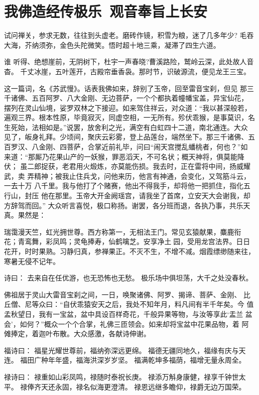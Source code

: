 \chapter{我佛造经传极乐~观音奉旨上长安}

试问禅关，参求无数，往往到头虚老。磨砖作镜，积雪为粮，迷了几多年少?
毛吞大海，芥纳须弥，金色头陀微笑。悟时超十地三乘，凝滞了四生六道。

谁
听得、绝想崖前，无阴树下，杜宇一声春晓?曹溪路险，鹫岭云深，此处故人音杳。
千丈冰崖，五叶莲开，古殿帘垂香袅。那时节，识破源流，便见龙王三宝。

这一篇词，名《苏武慢》。话表我佛如来，辞别了玉帝，回至雷音宝刹，但见
那三千诸佛、五百阿罗、八大金刚、无边菩萨，一个个都执着幢幡宝盖，异宝仙花，
摆列在灵山仙境，娑罗双林之下接迎。如来驾住祥云，对众道：“我以甚深般若，
遍观三界。根本性原，毕竟寂灭，同虚空相，一无所有。殄伏乖猴，是事莫识，名
生死始，法相如是。”说罢，放舍利之光，满空有白虹四十二道，南北通连。大众
见了，皈身礼拜。少顷间，聚庆云彩雾，登上品莲台，端然坐下。那三千诸佛、五
百罗汉、八金刚、四菩萨，合掌近前礼毕，问曰“闹天宫搅乱蟠桃者，何也？”如
来道：“那厮乃花果山产的一妖猴，罪恶滔天，不可名状；概天神将，俱莫能降伏；
虽二郎捉获，老君用火煅炼，亦莫能伤损。我去时，正在雷将中间，扬威耀武，卖
弄精神；被我止住兵戈，问他来历，他言有神通，会变化，又驾筋斗云，一去十万
八千里。我与他打了个赌赛，他出不得我手，却将他一把抓住，指化五行山，封压
他在那里。玉帝大开金阙瑶宫，请我坐了首席，立安天大会谢我，却方辞驾而回。”
大众听言喜悦，极口称扬。谢罢，各分班而退，各执乃事，共乐天真。果然是：

瑞霭漫天竺，虹光拥世尊。西方称第一，无相法王门。常见玄猿献果，麋鹿衔
花；青鸾舞，彩凤鸣；灵龟捧寿，仙鹤噙芝。安享净土园，受用龙宫法界。日日
花开，时时果熟。习静归真，参禅果正。不灭不生，不增不减。烟霞缥缈随来往，
寒暑无侵不记年。

诗曰：
去来自在任优游，也无恐怖也无愁。
极乐场中俱坦荡，大千之处没春秋。

佛祖居于灵山大雷音宝刹之间，一日，唤聚诸佛、阿罗、揭谛、菩萨、金刚、
比丘僧、尼等众曰：“自伏乖猿安天之后，我处不知年月，料凡间有半千年矣。今
值孟秋望日，我有一宝盆，盆中具设百样奇花，千般异果等物，与汝等享此‘盂兰
盆会’，如何？”概众一个个合掌，礼佛三匝领会。如来却将宝盆中花果品物，着
阿傩捧定，着迦叶布散。大众感激，各献诗伸谢。

福诗曰：
福星光耀世尊前，福纳弥深远更绵。
福德无疆同地久，福缘有庆与天连。
福田广种年年盛，福海洪深岁岁坚。
福满乾坤多福荫，福增无量永周全。

禄诗曰：
禄重如山彩凤鸣，禄随时泰祝长庚。
禄添万斛身康健，禄享千钟世太平。
禄俸齐天还永固，禄名似海更澄清。
禄恩远继多瞻仰，禄爵无边万国荣。

